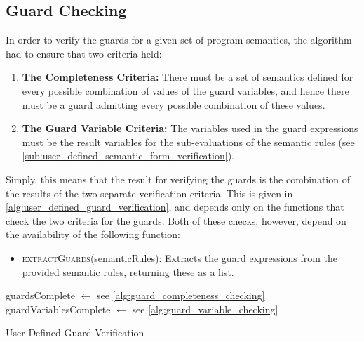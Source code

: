 

\subsection{Guard Checking} %
\label{sub:guard_checking}
In order to verify the guards for a given set of program semantics, the algorithm had to ensure that two criteria held:
\begin{enumerate}
    \item \textbf{The Completeness Criteria:} There must be a set of semantics defined for every possible combination of values of the guard variables, and hence there must be a guard admitting every possible combination of these values.
    \item \textbf{The Guard Variable Criteria:} The variables used in the guard expressions must be the result variables for the sub-evaluations of the semantic rules (see \autoref{sub:user_defined_semantic_form_verification}).
\end{enumerate}

Simply, this means that the result for verifying the guards is the combination of the results of the two separate verification criteria.
This is given in \autoref{alg:user_defined_guard_verification}, and depends only on the functions that check the two criteria for the guards. 
Both of these checks, however, depend on the availability of the following function:
\begin{itemize}
    \item \textsc{extractGuards}(semanticRules): Extracts the guard expressions from the provided semantic rules, returning these as a list. 
\end{itemize}

\begin{algorithm}[!htb]
\begin{algorithmic}
    \State guardsComplete $\gets$ 
    \Comment see \autoref{alg:guard_completeness_checking}
    \State guardVariablesComplete $\gets$ 
    \Comment see \autoref{alg:guard_variable_checking}
    \State {}
\EndFunction
\end{algorithmic}
\caption{User-Defined Guard Verification}
\label{alg:user_defined_guard_verification}
\end{algorithm}

